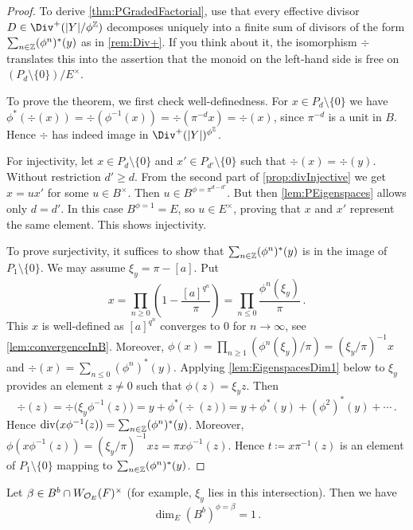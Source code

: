 \documentclass[a4paper, 10pt, oneside, DIV=9, chapterprefix=true, numbers=enddot,bibliography=totoc]{scrbook}
\begin{document}
\begin{proof}
	To derive \cref{thm:PGradedFactorial}, use that every effective divisor $D\in \Div^+(|Y|/\phi^\IZ)$ decomposes uniquely into a finite sum of divisors of the form $\sum_{n\in\IZ}(\phi^n)^*(y)$ as in \cref{rem:Div+}. If you think about it, the isomorphism $\div$ translates this into the assertion that the monoid on the left-hand side is free on $(P_d\setminus\{0\})/E^\times$.
	
	To prove the theorem, we first check well-definedness. For $x\in P_d\setminus\{0\}$ we have $\phi^*(\div(x))=\div(\phi^{-1}(x))=\div(\pi^{-d}x)=\div(x)$, since $\pi^{-d}$ is a unit in $B$. Hence $\div$ has indeed image in $\Div^+(|Y|)^{\phi^\IZ}$.
	
	For injectivity, let $x\in P_d\setminus\{0\}$ and $x'\in P_{d'}\setminus\{0\}$ such that $\div(x)=\div(y)$. Without restriction $d'\geq d$. From the second part of \cref{prop:divInjective} we get $x=ux'$ for some $u\in B^\times$. Then $u\in B^{\phi=\pi^{d-d'}}$. But then \cref{lem:PEigenspaces} allows only $d=d'$. In this case $B^{\phi=1}=E$, so $u\in E^\times$, proving that $x$ and $x'$  represent the same element. This shows injectivity.

	To prove surjectivity, it suffices to show that $\sum_{n\in\IZ}(\phi^n)^*(y)$ is in the image of $P_1\setminus\{0\}$. We may assume $\xi_y=\pi-[a]$. Put
	\begin{equation*}
		x=\prod_{n\geq 0}\left(1-\frac{[a]^{q^n}}{\pi}\right)=\prod_{n\leq 0}\frac{\phi^n(\xi_y)}\pi\,.
	\end{equation*}
	This $x$ is well-defined as $[a]^{q^n}$ converges to $0$ for $n\to\infty$, see \cref{lem:convergenceInB}. Moreover, $\phi(x)=\prod_{n\geq 1}(\phi^n(\xi_y)/\pi)=(\xi_y/\pi)^{-1}x$ and $\div(x)=\sum_{n\leq 0}(\phi^n)^*(y)$. Applying \cref{lem:EigenspacesDim1} below to $\xi_y$ provides an element $z\neq 0$ such that $\phi(z)=\xi_yz$. Then
	\begin{equation*}
		\div(z)=\div\big(\xi_y\phi^{-1}(z)\big)=y+\phi^*\big(\div(z)\big)=y+\phi^*(y)+(\phi^2)^*(y)+\dotsb\,.
	\end{equation*}
	Hence $\div(x\phi^{-1}(z))=\sum_{n\in\IZ}(\phi^n)^*(y)$. Moreover, $\phi(x\phi^{-1}(z))=(\xi_y/\pi)^{-1}xz=\pi x\phi^{-1}(z)$. Hence $t\coloneqq x\pi^{-1}(z)$ is an element of $P_1\setminus\{0\}$ mapping to $\sum_{n\in\IZ}(\phi^n)^*(y)$.
\end{proof}
\begin{lem}\label{lem:EigenspacesDim1}
	Let $\beta\in B^b\cap W_{\mathcal{O}_E}(F)^\times$ (for example, $\xi_y$ lies in this intersection). Then we have
	\begin{equation*}
		\dim_E(B^b)^{\phi=\beta}=1\,.
	\end{equation*}
\end{lem}
\end{document}
